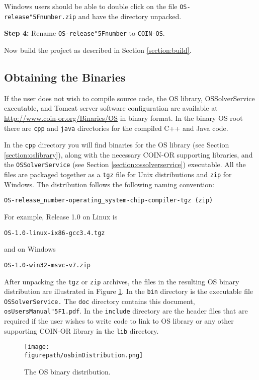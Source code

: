 \documentclass[11pt]{article}
\newcommand{\figurepath}{./figures}
\newcounter{Fig}
\renewcommand{\_}{{\char"5F}}
\renewcommand{\{}{{\char"7B}}
\renewcommand{\}}{{\char"7D}}
\renewcommand{\^}{{\char"0D}}
\renewcommand{\'}{{\char"0D}}
\begin{document}
Windows users should be  able to double click on the file {\tt OS-release\_number.zip} and have the directory unpacked. 

\vskip 8pt

{\bf Step 4:} Rename {\tt OS-release\_number} to {\tt COIN-OS}.  


Now build the project as described in  Section \ref{section:build}. 








\subsection{Obtaining the Binaries}\label{section:obtainingbinaries}

If the user does not wish to compile source code, the 
OS library, OSSolverService executable, and Tomcat server software configuration are available at \url{http://www.coin-or.org/Binaries/OS} in binary format.  In the binary OS root there  are {\tt cpp} and {\tt java} directories for the compiled C++ and Java code.

In the {\tt cpp} directory you will find binaries for the OS library (see Section \ref{section:oslibrary}), along with the necessary COIN-OR supporting libraries,  and the {\tt OSSolverService} (see Section \ref{section:ossolverservice})  executable.   All the files are packaged together as a {\tt tgz} file for Unix distributions and {\tt zip} for Windows.  The distribution follows the following naming convention:

\begin{verbatim}
OS-release_number-operating_system-chip-compiler-tgz (zip)
\end{verbatim}
For example, Release 1.0 on Linux is
\begin{verbatim}
OS-1.0-linux-ix86-gcc3.4.tgz
\end{verbatim}
and on Windows
\begin{verbatim}
OS-1.0-win32-msvc-v7.zip
\end{verbatim}
After unpacking the {\tt tgz} or {\tt zip} archives, the files in the resulting OS binary distribution are illustrated in Figure \ref{figure:osbindistribution}.   In the {\tt bin} directory is the executable file {\tt OSSolverService.}   The {\tt doc} directory contains this document, {\tt osUsersManual\_1.pdf}.
  In the {\tt include} directory are the header files that are required if the user wishes to write code to link to OS library or any other supporting COIN-OR library in the {\tt lib} directory.   
\begin{figure}
\centering
\texttt{[image: \\figurepath/osbinDistribution.png]}
\caption{The OS  binary distribution.} 
\label{figure:osbindistribution}
\end{figure}
\end{document}
